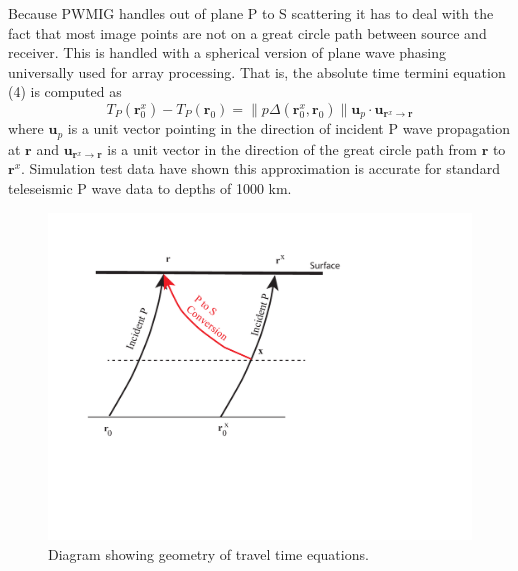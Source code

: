 \documentclass[12pt]{amsart}
\begin{document}
Because PWMIG handles out of plane P to S scattering it has to deal with the fact that most image points are not on a great
circle path between source and receiver.   This is handled with a spherical version of plane wave phasing universally used for
array processing.   That is, the absolute time termini equation (4) is computed as
\begin{equation}
T_P (\mathbf{r}_0 ^x)  - T_P (\mathbf{r}_0 )
=
\| p \Delta ( \mathbf{r}_0 ^x, \mathbf{r}_0 ) \| \mathbf{u}_p \cdot \mathbf{u}_{\mathbf{r} ^x \rightarrow \mathbf{r} }
\end{equation}
where $\mathbf{u}_p$ is a unit vector pointing in the direction of incident P wave propagation at $\mathbf{r}$  and 
$ \mathbf{u}_{\mathbf{r}^x \rightarrow \mathbf{r}}$ is a unit vector in the direction of the great circle path from 
 $\mathbf{r}$  to $\mathbf{r}^x$.   Simulation test data have shown this approximation is accurate 
 for standard teleseismic P wave data to 
 depths of 1000 km.   
 \begin{figure}[htbp]
\begin{center}
\includegraphics[width=6.0in]{pwmigttfigure.pdf}
\caption{
Diagram showing geometry of travel time equations.
}
\label{Figure1}
\end{center}
\end{figure}
\end{document}
